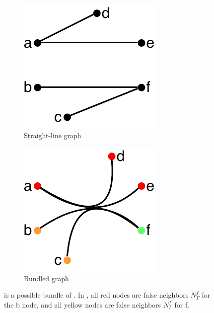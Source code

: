 \begin{figure}[t]
    \centering
    \begin{subfigure}{0.3\linewidth}
        \centering
        \includegraphics[width=0.9\linewidth]{figures/amb_value/0_amb_value.pdf}
        \caption{Straight-line graph}
        \label{fig:amb_value_0}
    \end{subfigure}
    \begin{subfigure}{0.3\linewidth}
        \centering
        \includegraphics[width=0.9\linewidth]{figures/amb_value/1_amb_value.pdf}
        \caption{Bundled graph}
        \label{fig:amb_value_1}
    \end{subfigure}
  \caption{ is a possible bundle of . In , all red nodes are false neighbors $N_{\Gamma}^f$ for the b node, and all yellow nodes are false neighbors $N_{\Gamma}^f$ for f. \cite{Straub2022}}
  \label{fig:ambiguity_2}
\end{figure}

